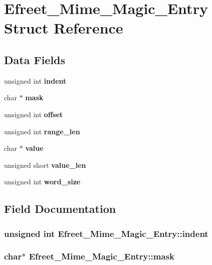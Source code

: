 \section{Efreet\_\-Mime\_\-Magic\_\-Entry Struct Reference}
\label{structEfreet__Mime__Magic__Entry}
\subsection*{Data Fields}
\begin{CompactItemize}
\item 
unsigned int {\bf indent}
\item 
char $\ast$ {\bf mask}
\item 
unsigned int {\bf offset}
\item 
unsigned int {\bf range\_\-len}
\item 
char $\ast$ {\bf value}
\item 
unsigned short {\bf value\_\-len}
\item 
unsigned int {\bf word\_\-size}
\end{CompactItemize}


\subsection{Field Documentation}
\subsubsection[indent]{\setlength{\rightskip}{0pt plus 5cm}unsigned int {\bf Efreet\_\-Mime\_\-Magic\_\-Entry::indent}}\label{structEfreet__Mime__Magic__Entry_cdab57a00bb85abfd5b8127d154c0331}


\subsubsection[mask]{\setlength{\rightskip}{0pt plus 5cm}char$\ast$ {\bf Efreet\_\-Mime\_\-Magic\_\-Entry::mask}}\label{structEfreet__Mime__Magic__Entry_bf5c05dc06030380579b069bc4f8ccf4}


